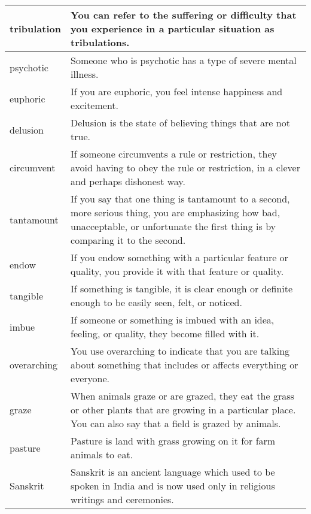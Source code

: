 \documentclass{article}
\begin{document}
\begin{center}
\begin{longtable}{|l|p{9cm}|}
\hline
tribulation
&
You can refer to the suffering or difficulty that you experience in a particular situation as tribulations.
\\

\hline
psychotic
&
Someone who is psychotic has a type of severe mental illness.
\\

\hline
euphoric
&
If you are euphoric, you feel intense happiness and excitement.
\\

\hline
delusion
&
Delusion is the state of believing things that are not true.
\\

\hline
circumvent
&
If someone circumvents a rule or restriction, they avoid having to obey the rule or restriction, in a clever and perhaps dishonest way.
\\

\hline
tantamount
&
If you say that one thing is tantamount to a second, more serious thing, you are emphasizing how bad, unacceptable, or unfortunate the first thing is by comparing it to the second.
\\

\hline
endow
&
If you endow something with a particular feature or quality, you provide it with that feature or quality.
\\

\hline
tangible
&
If something is tangible, it is clear enough or definite enough to be easily seen, felt, or noticed.
\\

\hline
imbue
&
If someone or something is imbued with an idea, feeling, or quality, they become filled with it.
\\

\hline
overarching
&
You use overarching to indicate that you are talking about something that includes or affects everything or everyone.
\\

\hline
graze
&
When animals graze or are grazed, they eat the grass or other plants that are growing in a particular place. You can also say that a field is grazed by animals.
\\

\hline
pasture
&
Pasture is land with grass growing on it for farm animals to eat.
\\

\hline
Sanskrit
&
Sanskrit is an ancient language which used to be spoken in India and is now used only in religious writings and ceremonies.
\\


\end{longtable}
\end{center}
\end{document}
